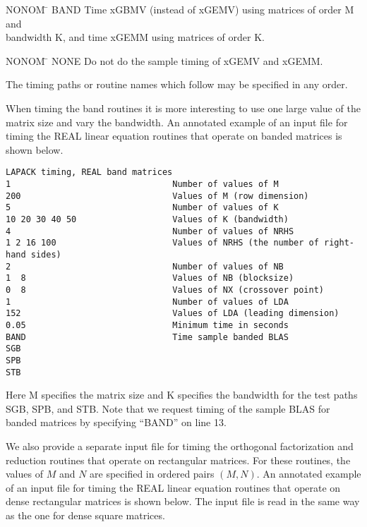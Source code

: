\begin{tabbing}
NONOM \= \kill
BAND \> Time xGBMV (instead of xGEMV) using matrices of order M and \\
     \>  bandwidth K, and time xGEMM using matrices of order K.
\end{tabbing}
\begin{tabbing}
NONOM \= \kill
NONE \> Do not do the sample timing of xGEMV and xGEMM.
\end{tabbing}
The timing paths or routine names which follow
may be specified in any order.

When timing the band routines it is more interesting to use
one large value of the matrix size and vary the bandwidth.
An annotated example of an input file for timing the
REAL linear equation routines that operate on banded matrices is
shown below.

\begin{verbatim}
LAPACK timing, REAL band matrices
1                                Number of values of M
200                              Values of M (row dimension)
5                                Number of values of K
10 20 30 40 50                   Values of K (bandwidth)
4                                Number of values of NRHS
1 2 16 100                       Values of NRHS (the number of right-hand sides)
2                                Number of values of NB
1  8                             Values of NB (blocksize)
0  8                             Values of NX (crossover point)
1                                Number of values of LDA
152                              Values of LDA (leading dimension)
0.05                             Minimum time in seconds
BAND                             Time sample banded BLAS
SGB
SPB
STB
\end{verbatim}

\noindent
Here M specifies the matrix size and K specifies
the bandwidth for the test paths SGB, SPB, and STB.
Note that we request timing of the sample BLAS for banded matrices
by specifying ``BAND'' on line 13.

We also provide a separate input file for timing the orthogonal 
factorization and reduction routines that operate on rectangular
matrices.
For these routines, the values of $M$ and $N$ are specified in
ordered pairs $(M, N)$.
An annotated example of an input file for timing the
REAL linear equation routines that operate on dense rectangular matrices is
shown below.  The input file is read in the same way as the one for dense
square matrices.


